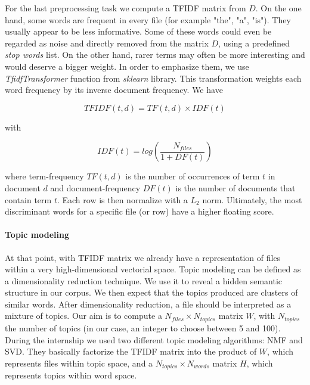 \documentclass[a4paper]{article}
\begin{document}
	For the last preprocessing task we compute a \ac{TFIDF} matrix from $D$. On the one hand, some words are frequent in every file (for example "the", "a", "is"). They usually appear to be less informative. Some of these words could even be regarded as noise and directly removed from the matrix $D$, using a predefined \emph{stop words} list. On the other hand, rarer terms may often be more interesting and would deserve a bigger weight. In order to emphasize them, we use \emph{TfidfTransformer} function from \emph{sklearn} library. This transformation weights each word frequency by its inverse document frequency. We have
	
	\begin{equation}
		TFIDF(t, d) = TF(t, d) \times IDF(t)
	\end{equation}
	
	with 
	
	\begin{equation}
		IDF(t) = log(\frac{N_{files}}{1 + DF(t)})
	\end{equation}
	
	where term-frequency $TF(t, d)$ is the number of occurrences of term $t$ in document $d$ and document-frequency $DF(t)$ is the number of documents that contain term $t$. Each row is then normalize with a $L_{2}$ norm. Ultimately, the most discriminant words for a specific file (or row) have a higher floating score. 
	
	\paragraph{Topic modeling}
	
	At that point, with \ac{TFIDF} matrix we already have a representation of files within a very high-dimensional vectorial space. Topic modeling can be defined as a dimensionality reduction technique. We use it to reveal a hidden semantic structure in our corpus. We then expect that the topics produced are clusters of similar words. After dimensionality reduction, a file should be interpreted as a mixture of topics. Our aim is to compute a $N_{files} \times N_{topics}$ matrix $W$, with $N_{topics}$ the number of topics (in our case, an integer to choose between 5 and 100). During the internship we used two different topic modeling algorithms: \ac{NMF} and \ac{SVD}. They basically factorize the \ac{TFIDF} matrix into the product of $W$, which represents files within topic space, and a $N_{topics} \times N_{words}$ matrix $H$, which represents topics within word space.
	
\end{document}
